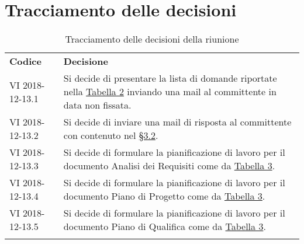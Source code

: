 \clearpage
\section{Tracciamento delle decisioni}
\begin{center}
	\renewcommand{\arraystretch}{1.5}
	\begin{longtable}{  p{2.8cm} p{11.4cm} }
		\rowcolor{tableHeadYellow}
		\textbf{Codice}&\textbf{Decisione}\\
		VI 2018-12-13.1 & Si decide di presentare la lista di domande riportate nella \hyperref[sec:tabella_riassuntiva1]{Tabella 2} inviando una mail al committente in data non fissata.\\
		VI 2018-12-13.2 & Si decide di inviare una mail di risposta al committente con contenuto nel \hyperref[sec:mail]{§3.2}.\\
		VI 2018-12-13.3 & Si decide di formulare la pianificazione di lavoro per il documento Analisi dei Requisiti come da \hyperref[sec:tabella_riassuntiva3]{Tabella 3}.\\
		VI 2018-12-13.4 & Si decide di formulare la pianificazione di lavoro per il documento Piano di Progetto come da \hyperref[sec:tabella_riassuntiva3]{Tabella 3}.\\
		VI 2018-12-13.5 & Si decide di formulare la pianificazione di lavoro per il documento Piano di Qualifica come da \hyperref[sec:tabella_riassuntiva3]{Tabella 3}.\\
		\rowcolor{white}
		\caption{Tracciamento delle decisioni della riunione}
	\end{longtable}	
\end{center}